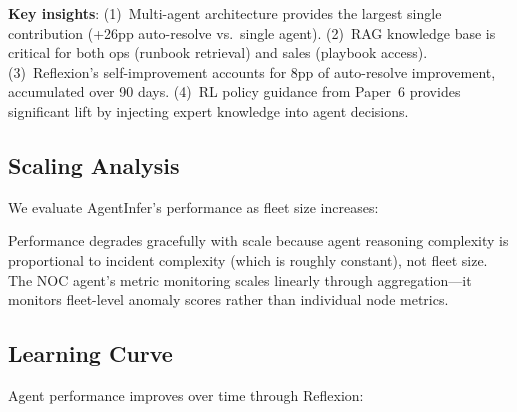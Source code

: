 \documentclass[conference,10pt,letterpaper]{IEEEtran}
\begin{document}
\textbf{Key insights}: (1)~Multi-agent architecture provides the largest single contribution (+26pp auto-resolve vs.\ single agent). (2)~RAG knowledge base is critical for both ops (runbook retrieval) and sales (playbook access). (3)~Reflexion's self-improvement accounts for 8pp of auto-resolve improvement, accumulated over 90 days. (4)~RL policy guidance from Paper~6 provides significant lift by injecting expert knowledge into agent decisions.

\subsection{Scaling Analysis}

We evaluate AgentInfer's performance as fleet size increases:

\begin{table}[!t]
\caption{Scaling: Agent Performance vs.\ Fleet Size}
\label{tab:scaling}
\centering\scriptsize
{}
\end{table}

Performance degrades gracefully with scale because agent reasoning complexity is proportional to incident complexity (which is roughly constant), not fleet size. The NOC agent's metric monitoring scales linearly through aggregation---it monitors fleet-level anomaly scores rather than individual node metrics.

\subsection{Learning Curve}

Agent performance improves over time through Reflexion:
\end{document}
